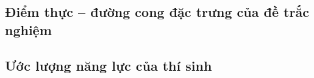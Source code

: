 \subsection{Điểm thực – đường cong đặc trưng của đề trắc nghiệm}
\subsection{Ước lượng năng lực của thí sinh}


